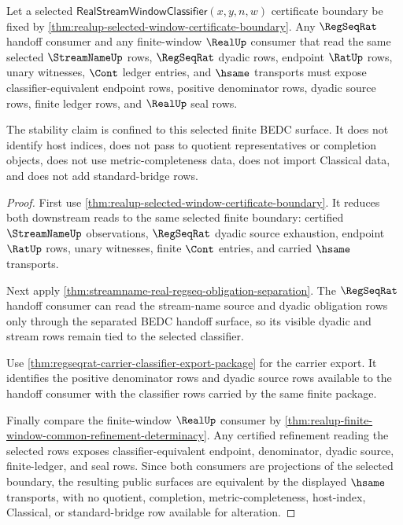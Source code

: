 \begin{theorem}
\label{thm:realup-selected-window-consumer-stability}
Let a selected $\mathsf{RealStreamWindowClassifier}(x,y,n,w)$ certificate
boundary be fixed by
\autoref{thm:realup-selected-window-certificate-boundary}. Any
$\RegSeqRat$ handoff consumer and any finite-window $\RealUp$ consumer that
read the same selected $\StreamNameUp$ rows, $\RegSeqRat$ dyadic rows,
endpoint $\RatUp$ rows, unary witnesses, $\Cont$ ledger entries, and
$\hsame$ transports must expose classifier-equivalent endpoint rows, positive
denominator rows, dyadic source rows, finite ledger rows, and $\RealUp$ seal
rows.

The stability claim is confined to this selected finite BEDC surface. It does
not identify host indices, does not pass to quotient representatives or
completion objects, does not use metric-completeness data, does not import
Classical data, and does not add standard-bridge rows.
\end{theorem}
\begin{proof}
First use
\autoref{thm:realup-selected-window-certificate-boundary}. It reduces both
downstream reads to the same selected finite boundary: certified
$\StreamNameUp$ observations, $\RegSeqRat$ dyadic source exhaustion, endpoint
$\RatUp$ rows, unary witnesses, finite $\Cont$ entries, and carried $\hsame$
transports.

Next apply
\autoref{thm:streamname-real-regseq-obligation-separation}. The
$\RegSeqRat$ handoff consumer can read the stream-name source and dyadic
obligation rows only through the separated BEDC handoff surface, so its
visible dyadic and stream rows remain tied to the selected classifier.

Use
\autoref{thm:regseqrat-carrier-classifier-export-package} for the carrier
export. It identifies the positive denominator rows and dyadic source rows
available to the handoff consumer with the classifier rows carried by the
same finite package.

Finally compare the finite-window $\RealUp$ consumer by
\autoref{thm:realup-finite-window-common-refinement-determinacy}. Any
certified refinement reading the selected rows exposes classifier-equivalent
endpoint, denominator, dyadic source, finite-ledger, and seal rows. Since both
consumers are projections of the selected boundary, the resulting public
surfaces are equivalent by the displayed $\hsame$ transports, with no
quotient, completion, metric-completeness, host-index, Classical, or
standard-bridge row available for alteration.
\end{proof}

